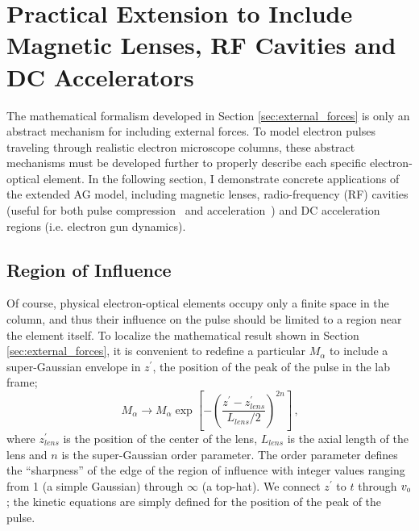 
\section{Practical Extension to Include Magnetic Lenses, RF Cavities and DC Accelerators}

The mathematical formalism developed in Section \ref{sec:external_forces} is only an abstract mechanism for including external forces.
To model electron pulses traveling through realistic electron microscope columns, these abstract mechanisms must be developed further to properly describe each specific electron-optical element.
In the following section, I demonstrate concrete applications of the extended AG model, including magnetic lenses, radio-frequency (RF) cavities (useful for both pulse compression~\cite{oudheusden_electron_2007} and acceleration~\cite{kim_rf_1989}) and DC acceleration regions (i.e. electron gun dynamics).

\subsection{Region of Influence}

Of course, physical electron-optical elements occupy only a finite space in the column, and thus their influence on the pulse should be limited to a region near the element itself.
To localize the mathematical result shown in Section \ref{sec:external_forces}, it is convenient to redefine a particular $M_{\alpha}$ to include a super-Gaussian envelope in $z^{\prime}$, the position of the peak of the pulse in the lab frame;
\begin{equation} \label{eq:reg_of_influence}
  M_{\alpha} \to M_{\alpha} \exp \left [ - \left (  \frac{ z^{\prime} - z_{lens}^{\prime} }{ L_{lens} / 2 } \right )^{ 2 n } \right ] \,\text{,}
\end{equation}
where $z_{lens}^{\prime}$ is the position of the center of the lens, $L_{lens}$ is the axial length of the lens and $n$ is the super-Gaussian order parameter.
The order parameter defines the ``sharpness'' of the edge of the region of influence with integer values ranging from 1 (a simple Gaussian) through $\infty$ (a top-hat).
We connect $z^{\prime}$ to $t$ through $ v_{{\scriptscriptstyle 0}} $; the kinetic equations are simply defined for the position of the peak of the pulse.

